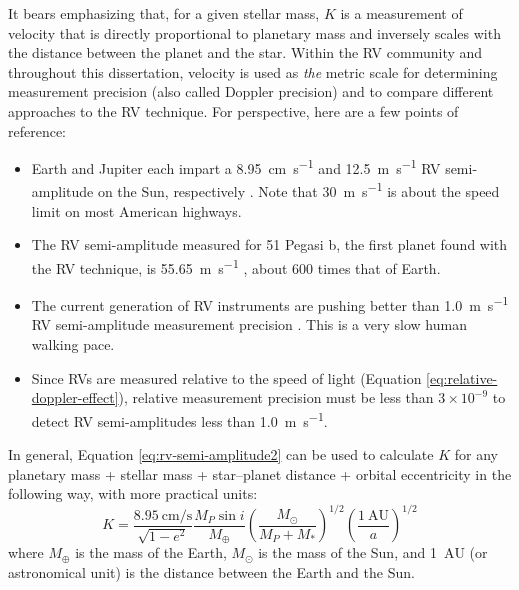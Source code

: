 It bears emphasizing that, for a given stellar mass, $K$ is a measurement of velocity that is directly proportional to planetary mass and inversely scales with the distance between the planet and the star. Within the RV community and throughout this dissertation, velocity is used as \textit{the} metric scale for determining measurement precision (also called Doppler precision) and to compare different approaches to the RV technique. For perspective, here are a few points of reference:
\begin{itemize}
    \item Earth and Jupiter each impart a 8.95~\si{\centi\meter\per\second} and 12.5~\si{\meter\per\second} RV semi-amplitude on the Sun, respectively \citep{lovis_radial_2011}. Note that 30~\si{\meter\per\second} is about the speed limit on most American highways.
    \item The RV semi-amplitude measured for 51 Pegasi b, the first planet found with the RV technique, is 55.65~\si{\meter\per\second} \citep{mayor_jupiter-mass_1995}, about 600 times that of Earth.
    \item The current generation of RV instruments are pushing better than 1.0~\si{\meter\per\second} RV semi-amplitude measurement precision \citep{fischer_state_2016}. This is a very slow human walking pace.
    \item Since RVs are measured relative to the speed of light (Equation \ref{eq:relative-doppler-effect}), relative measurement precision must be less than $3\times10^{-9}$ to detect RV semi-amplitudes less than 1.0~\si{\meter\per\second}.
\end{itemize}
In general, Equation \ref{eq:rv-semi-amplitude2} can be used to calculate $K$ for any planetary mass + stellar mass + star--planet distance + orbital eccentricity in the following way, with more practical units:
\begin{equation}
    K = \frac{8.95~\si{\centi\meter\per\second}}{\sqrt{1-e^2}} \frac{M_P \sin{i}}{M_\oplus} \left( \frac{M_\odot}{M_P+M_*} \right)^{1/2} \left(\frac{1~\mathrm{AU}}{a} \right)^{1/2}
\end{equation}
where $M_\oplus$ is the mass of the Earth, $M_\odot$ is the mass of the Sun, and 1~$\mathrm{AU}$ (or astronomical unit) is the distance between the Earth and the Sun.

